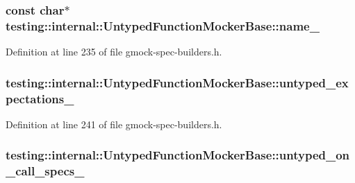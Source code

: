 \subsubsection[{\texorpdfstring{name\+\_\+}{name_}}]{\setlength{\rightskip}{0pt plus 5cm}const char$\ast$ testing\+::internal\+::\+Untyped\+Function\+Mocker\+Base\+::name\+\_\+\hspace{0.3cm}{\ttfamily [protected]}}\hypertarget{classtesting_1_1internal_1_1_untyped_function_mocker_base_a2d472077b9a8d3758caaec5770259f70}{}\label{classtesting_1_1internal_1_1_untyped_function_mocker_base_a2d472077b9a8d3758caaec5770259f70}


Definition at line 235 of file gmock-\/spec-\/builders.\+h.

\subsubsection[{\texorpdfstring{untyped\+\_\+expectations\+\_\+}{untyped_expectations_}}]{ testing\+::internal\+::\+Untyped\+Function\+Mocker\+Base\+::untyped\+\_\+expectations\+\_\+\hspace{0.3cm}{\ttfamily [protected]}}\hypertarget{classtesting_1_1internal_1_1_untyped_function_mocker_base_aae4a42a4bace1fcb0cd4bdf1ddd40277}{}\label{classtesting_1_1internal_1_1_untyped_function_mocker_base_aae4a42a4bace1fcb0cd4bdf1ddd40277}


Definition at line 241 of file gmock-\/spec-\/builders.\+h.

\subsubsection[{\texorpdfstring{untyped\+\_\+on\+\_\+call\+\_\+specs\+\_\+}{untyped_on_call_specs_}}]{ testing\+::internal\+::\+Untyped\+Function\+Mocker\+Base\+::untyped\+\_\+on\+\_\+call\+\_\+specs\+\_\+\hspace{0.3cm}{\ttfamily [protected]}}\hypertarget{classtesting_1_1internal_1_1_untyped_function_mocker_base_aed2a1913f6c03fd47c8900039556be34}{}\label{classtesting_1_1internal_1_1_untyped_function_mocker_base_aed2a1913f6c03fd47c8900039556be34}


